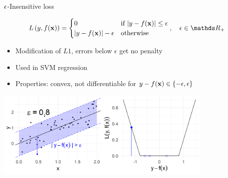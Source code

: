 \documentclass[11pt,compress,t,notes=noshow, xcolor=table]{beamer}
\begin{document}
\begin{vbframe}{$\epsilon$-Insensitive loss}

\vspace*{-0.3cm}
$$
\Lxy =  \begin{cases}
  0  & \text{if } |y - \fx| \le \epsilon \\
  |y - \fx|-\epsilon & \text{otherwise }
  \end{cases}, \quad \epsilon \in \R_{+}
$$
\begin{itemize}
\item Modification of $L1$, errors below $\epsilon$ get no penalty
\item Used in SVM regression
\item Properties: convex, not differentiable for $ y - f(\mathbf{x}) \in \{-\epsilon, \epsilon\}$
\end{itemize}

\vfill

\begin{center}
\includegraphics[width = 0.8\textwidth]{figure/loss_eps_insensitive.png}
\end{center}

\end{vbframe}
\end{document}
